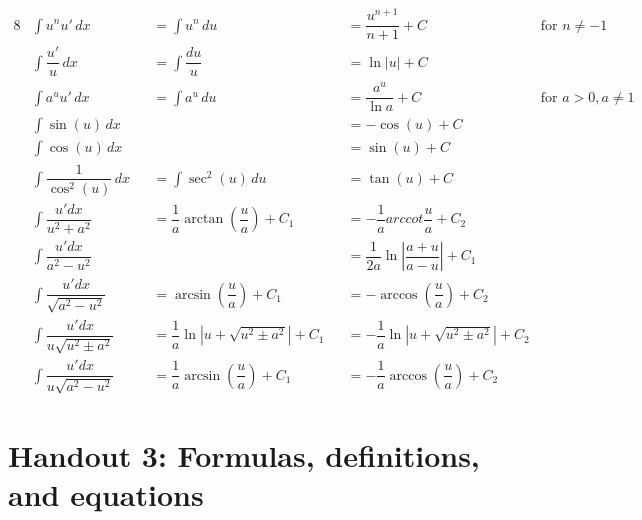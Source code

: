 \documentclass[a4paper,12pt,openany]{book}
\begin{document}
\begin{alignat*}{8}
    &\int u^n u' \, dx  &&= \int u^n \, du 
    &&= \dfrac{u^{n+1}}{n+1} + C &\text{for } n \neq -1 \\
    &\int \dfrac{u'}{u} \, dx &&= \int \dfrac{du}{u} 
    &&= \ln|u| + C & \\
    &\int a^u u' \, dx &&= \int a^u \, du 
    &&= \dfrac{a^u}{\ln a} + C &\text{for } a > 0, a \neq 1 \\
    &\int \sin(u) \, dx && &&= -\cos(u) + C & \\
    &\int \cos(u) \, dx && &&= \sin(u) + C & \\
    &\int \dfrac{1}{\cos^2(u)} \, dx 
    &&= \int \sec^2(u) \, du &&= \tan(u) + C & \\
    &\int \dfrac{u'dx}{u^2+a^2} && = \dfrac{1}{a} \arctan\left(\dfrac{u}{a}\right) + C_1 
    &&= -\dfrac{1}{a}arccot\dfrac{u}{a} + C_2 & \\
    &\int \dfrac{u'dx}{a^2-u^2} && &&= \dfrac{1}{2a}\ln\left|\dfrac{a+u}{a-u}\right| + C_1\\
    &\int \dfrac{u'dx}{\sqrt{a^2-u^2}} &&= \arcsin\left(\dfrac{u}{a}\right) + C_1
    &&= -\arccos\left(\dfrac{u}{a}\right) + C_2 & \\
    &\int \dfrac{u'dx}{u\sqrt{u^2\pm a^2}} &&= \dfrac{1}{a}\ln\left|u+\sqrt{u^2\pm a^2}\right| + C_1
    &&= -\dfrac{1}{a}\ln\left|u+\sqrt{u^2\pm a^2}\right| + C_2 & \\
    &\int \dfrac{u'dx}{u\sqrt{a^2-u^2}} &&= \dfrac{1}{a}\arcsin\left(\dfrac{u}{a}\right) + C_1 &&= -\dfrac{1}{a}\arccos\left(\dfrac{u}{a}\right) + C_2
\end{alignat*}

\section{Handout 3: Formulas, definitions, and equations}
\end{document}
